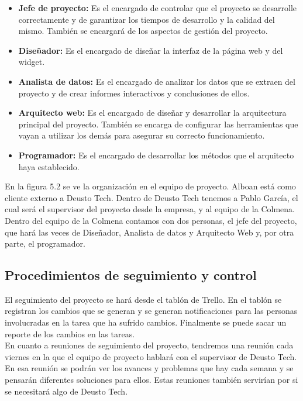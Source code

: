 \begin{itemize}
	\item \textbf{Jefe de proyecto:} Es el encargado de controlar que el proyecto se desarrolle correctamente y de garantizar los tiempos de desarrollo y la calidad del mismo. También se encargará de los aspectos de gestión del proyecto.
	\item \textbf{Diseñador:} Es el encargado de diseñar la interfaz de la página web y del widget.
	\item \textbf{Analista de datos:} Es el encargado de analizar los datos que se extraen del proyecto y de crear informes interactivos y conclusiones de ellos.
	\item \textbf{Arquitecto web:} Es el encargado de diseñar y desarrollar la arquitectura principal del proyecto. También se encarga de configurar las herramientas que vayan a utilizar los demás para asegurar su correcto funcionamiento.
	\item \textbf{Programador:} Es el encargado de desarrollar los métodos que el arquitecto haya establecido.
\end{itemize}

En la figura 5.2 se ve la organización en el equipo de proyecto. Alboan está como cliente externo a Deusto Tech. Dentro de Deusto Tech tenemos a Pablo García, el cual será el supervisor del proyecto desde la empresa, y al equipo de la Colmena. Dentro del equipo de la Colmena contamos con dos personas, el jefe del proyecto, que hará las veces de Diseñador, Analista de datos y Arquitecto Web y, por otra parte, el programador.


\subsection{Procedimientos de seguimiento y control}

El seguimiento del proyecto se hará desde el tablón de Trello. En el tablón se registran los cambios que se generan y se generan notificaciones para las personas involucradas en la tarea que ha sufrido cambios. Finalmente se puede sacar un reporte de los cambios en las tareas.\\

En cuanto a reuniones de seguimiento del proyecto, tendremos una reunión cada viernes en la que el equipo de proyecto hablará con el supervisor de Deusto Tech. En esa reunión se podrán ver los avances y problemas que hay cada semana y se pensarán diferentes soluciones para ellos. Estas reuniones también servirían por si se necesitará algo de Deusto Tech.

